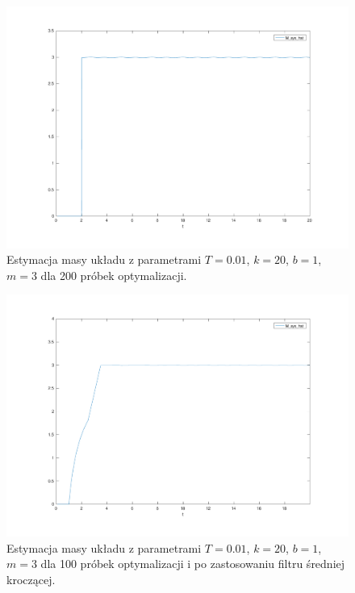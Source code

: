 \documentclass[a4paper]{article}
\begin{document}
\begin{figure}[H]
	\includegraphics[width=0.99\linewidth]{system200_mass}
	\centering
	\caption{Estymacja masy układu z parametrami $T=0.01$, $k = 20$, $b = 1$, $m = 3$ dla 200 próbek optymalizacji.}
	\label{fig:system200_mass}
\end{figure}

\begin{figure}[H]
	\includegraphics[width=0.99\linewidth]{filter_mass}
	\centering
	\caption{Estymacja masy układu z parametrami $T=0.01$, $k = 20$, $b = 1$, $m = 3$ dla 100 próbek optymalizacji i po zastosowaniu filtru średniej kroczącej.}
	\label{fig:filter_mass}
\end{figure}
\end{document}
